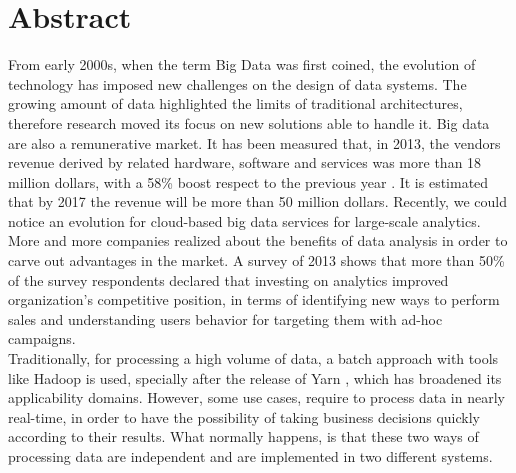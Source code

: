 \chapter*{Abstract}

From early 2000s, when the term Big Data was first coined, the evolution of technology has imposed new challenges on the design of data systems. The growing amount of data highlighted the limits of traditional architectures, therefore research moved its focus on new solutions able to handle it. Big data are also a remunerative market. It has been measured that, in 2013, the vendors revenue derived by related hardware, software and services was more than 18 million dollars, with a 58\% boost respect to the previous year \cite{bib29}. It is estimated that by 2017 the revenue will be more than 50 million dollars. Recently, we could notice an evolution for cloud-based big data services for large-scale analytics. More and more companies realized about the benefits of data analysis in order to carve out advantages in the market. A survey of 2013 \cite{bib32} shows that more than 50\% of the survey respondents declared that investing on analytics improved organization's competitive position, in terms of identifying new ways to perform sales and understanding users behavior for targeting them with ad-hoc campaigns.\\
Traditionally, for processing a high volume of data, a batch approach with tools like Hadoop is used, specially after the release of Yarn \cite{bib24}, which has broadened its applicability domains. However, some use cases, require to process data in nearly real-time, in order to have the possibility of taking business decisions quickly according to their results. What normally happens, is that these two ways of processing data are independent and are implemented in two different systems.\\
